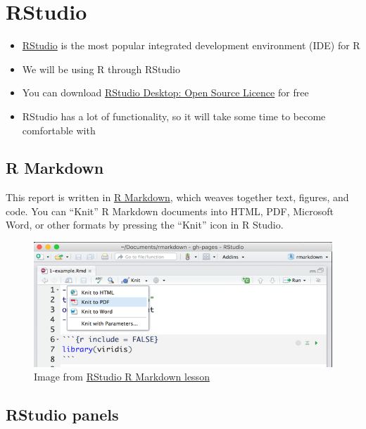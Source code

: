 \documentclass[]{article}
\providecommand{\tightlist}{%
  \setlength{\itemsep}{0pt}\setlength{\parskip}{0pt}}
\begin{document}
\section{RStudio}\label{rstudio}

\begin{itemize}
\tightlist
\item
  \href{https://www.rstudio.com/}{RStudio} is the most popular
  integrated development environment (IDE) for R\\
\item
  We will be using R through RStudio\\
\item
  You can download
  \href{https://www.rstudio.com/products/rstudio/download/}{RStudio
  Desktop: Open Source Licence} for free
\item
  RStudio has a lot of functionality, so it will take some time to
  become comfortable with
\end{itemize}

\subsection{R Markdown}\label{r-markdown}

This report is written in \href{https://rmarkdown.rstudio.com/}{R
Markdown}, which weaves together text, figures, and code. You can
``Knit'' R Markdown documents into HTML, PDF, Microsoft Word, or other
formats by pressing the ``Knit'' icon in R Studio.

\begin{figure}
\centering
\includegraphics{knit.png}
\caption{Image from
\href{https://rmarkdown.rstudio.com/lesson-9.html}{RStudio R Markdown
lesson}}
\end{figure}

\subsection{RStudio panels}\label{rstudio-panels}
\end{document}
